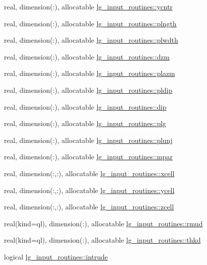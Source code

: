 \begin{DoxyCompactItemize}
\item 
real, dimension(\+:), allocatable \hyperlink{namespacelg__input__routines_a72b37b88e326c2674a9dfad3146d0d1a}{lg\+\_\+input\+\_\+routines\+::ycntr}
\item 
real, dimension(\+:), allocatable \hyperlink{namespacelg__input__routines_a03aa89b2ee045a49ecf9b35b1acae19b}{lg\+\_\+input\+\_\+routines\+::plngth}
\item 
real, dimension(\+:), allocatable \hyperlink{namespacelg__input__routines_a522e8b0feae02752d8143fc403ef2e2a}{lg\+\_\+input\+\_\+routines\+::plwdth}
\item 
real, dimension(\+:), allocatable \hyperlink{namespacelg__input__routines_ac8e6a73637bd5b85bdfbfc0734b3e44a}{lg\+\_\+input\+\_\+routines\+::dzm}
\item 
real, dimension(\+:), allocatable \hyperlink{namespacelg__input__routines_a6d226e3be6f444eac6f99d17e5218516}{lg\+\_\+input\+\_\+routines\+::plazm}
\item 
real, dimension(\+:), allocatable \hyperlink{namespacelg__input__routines_ac6bd69a2747719d0ad644d5ef9d7cb19}{lg\+\_\+input\+\_\+routines\+::pldip}
\item 
real, dimension(\+:), allocatable \hyperlink{namespacelg__input__routines_ac11fcc9d6ce359143f3e92b12bc56633}{lg\+\_\+input\+\_\+routines\+::dip}
\item 
real, dimension(\+:), allocatable \hyperlink{namespacelg__input__routines_a0218ae3d8505863872da20098e847208}{lg\+\_\+input\+\_\+routines\+::plg}
\item 
real, dimension(\+:), allocatable \hyperlink{namespacelg__input__routines_ae9c8530efd2c73ef8ec9473314036af3}{lg\+\_\+input\+\_\+routines\+::plunj}
\item 
real, dimension(\+:), allocatable \hyperlink{namespacelg__input__routines_a5acee0395ffda270aed2b17278023be5}{lg\+\_\+input\+\_\+routines\+::mpar}
\item 
real, dimension(\+:,\+:), allocatable \hyperlink{namespacelg__input__routines_ac7350915506378146fba877e70cf9e5a}{lg\+\_\+input\+\_\+routines\+::xcell}
\item 
real, dimension(\+:,\+:), allocatable \hyperlink{namespacelg__input__routines_aeabe65741a073352b67eaf406562ccc2}{lg\+\_\+input\+\_\+routines\+::ycell}
\item 
real, dimension(\+:,\+:), allocatable \hyperlink{namespacelg__input__routines_a360b94863ccd8f0b4888cf64d3f7f2da}{lg\+\_\+input\+\_\+routines\+::zcell}
\item 
real(kind=ql), dimension(\+:), allocatable \hyperlink{namespacelg__input__routines_a8b4948887cc082e53fbe8765475f1a6e}{lg\+\_\+input\+\_\+routines\+::rmud}
\item 
real(kind=ql), dimension(\+:), allocatable \hyperlink{namespacelg__input__routines_ae7adf9ffc0177ce752a4b28042df09ce}{lg\+\_\+input\+\_\+routines\+::thkd}
\item 
logical \hyperlink{namespacelg__input__routines_a24ada50400969251dbef61f7706a66cc}{lg\+\_\+input\+\_\+routines\+::intrude}
\end{DoxyCompactItemize}


